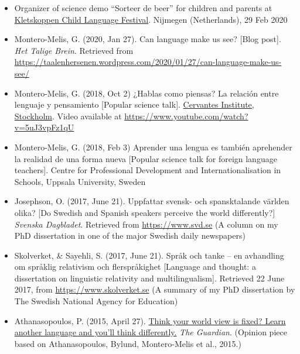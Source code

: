 \documentclass[margin, 11pt]{res} %
\begin{document}
\begin{resume}
\begin{itemize}
\item Organizer of science demo ``Sorteer de beer'' for children and parents at \href{http://www.kletskoppenfestival.nl/}{Kletskoppen Child Language Festival}. Nijmegen (Netherlands), 29 Feb 2020

\item Montero-Melis, G. (2020, Jan 27). Can language make us see? [Blog post]. \emph{Het Talige Brein}. Retrieved from \url{https://taalenhersenen.wordpress.com/2020/01/27/can-language-make-us-see/}

\item Montero-Melis, G. (2018, Oct 2) ¿Hablas como piensas? La relación entre lenguaje y pensamiento [Popular science talk].  \href{https://cultura.cervantes.es/estocolmo/es/-hablas-como-piensas--la-relacion-entre-el-lenguaje-y-el-pensamiento/122695}{Cervantes Institute, Stockholm}.
Video available at \url{https://www.youtube.com/watch?v=5uJ3vpFz1qU}

\item Montero-Melis, G. (2018, Feb 3) Aprender una lengua es también aprehender la realidad de una forma nueva [Popular science talk for foreign language teachers]. Centre for Professional Development and Internationalisation in Schools, Uppsala University, Sweden

\item Josephson, O. (2017, June 21). Uppfattar svensk- och spansktalande v{\"a}rlden olika? [Do Swedish and Spanish speakers perceive the world differently?] \emph{Svenska Dagbladet}. Retrieved from \url{https://www.svd.se} (A column on my PhD dissertation in one of the major Swedish daily newspapers)

\item Skolverket, \& Sayehli, S. (2017, June 21). Spr{\aa}k och tanke -- en avhandling om spr{\aa}klig relativism och flerspr{\aa}kighet [Language and thought: a dissertation on linguistic relativity and multilingualism]. Retrieved 22 June 2017, from \url{https://www.skolverket.se} (A summary of my PhD dissertation by The Swedish National Agency for Education)

\item Athanasopoulos, P. (2015, April 27). \href{https://www.theguardian.com/commentisfree/2015/apr/27/world-view-learn-another-language}{Think your world view is fixed? Learn another language and you'll think differently.} \emph{The Guardian}. (Opinion piece based on Athanasopoulos, Bylund, Montero-Melis et al., 2015.)

\end{itemize}



\end{resume}
\end{document}
